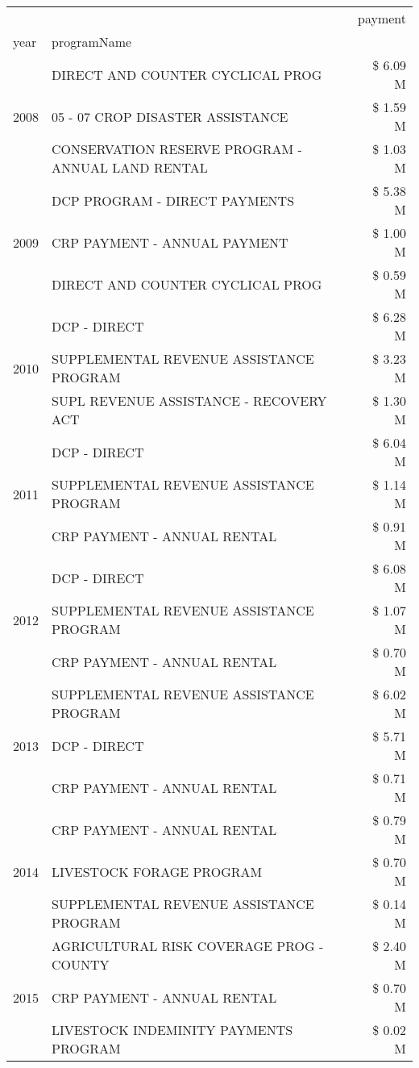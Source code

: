 \begin{tabular}{llr}
\toprule
 &  & payment \\
year & programName &  \\
\midrule
\multirow[t]{3}{*}{2008} & DIRECT AND COUNTER CYCLICAL PROG & \$ 6.09 M \\
 & 05 - 07 CROP DISASTER ASSISTANCE & \$ 1.59 M \\
 & CONSERVATION RESERVE PROGRAM - ANNUAL LAND RENTAL & \$ 1.03 M \\
\cline{1-3}
\multirow[t]{3}{*}{2009} & DCP PROGRAM - DIRECT PAYMENTS & \$ 5.38 M \\
 & CRP PAYMENT - ANNUAL PAYMENT & \$ 1.00 M \\
 & DIRECT AND COUNTER CYCLICAL PROG & \$ 0.59 M \\
\cline{1-3}
\multirow[t]{3}{*}{2010} & DCP - DIRECT & \$ 6.28 M \\
 & SUPPLEMENTAL REVENUE ASSISTANCE PROGRAM & \$ 3.23 M \\
 & SUPL REVENUE ASSISTANCE - RECOVERY ACT & \$ 1.30 M \\
\cline{1-3}
\multirow[t]{3}{*}{2011} & DCP - DIRECT & \$ 6.04 M \\
 & SUPPLEMENTAL REVENUE ASSISTANCE PROGRAM & \$ 1.14 M \\
 & CRP PAYMENT - ANNUAL RENTAL & \$ 0.91 M \\
\cline{1-3}
\multirow[t]{3}{*}{2012} & DCP - DIRECT & \$ 6.08 M \\
 & SUPPLEMENTAL REVENUE ASSISTANCE PROGRAM & \$ 1.07 M \\
 & CRP PAYMENT - ANNUAL RENTAL & \$ 0.70 M \\
\cline{1-3}
\multirow[t]{3}{*}{2013} & SUPPLEMENTAL REVENUE ASSISTANCE PROGRAM & \$ 6.02 M \\
 & DCP - DIRECT & \$ 5.71 M \\
 & CRP PAYMENT - ANNUAL RENTAL & \$ 0.71 M \\
\cline{1-3}
\multirow[t]{3}{*}{2014} & CRP PAYMENT - ANNUAL RENTAL & \$ 0.79 M \\
 & LIVESTOCK FORAGE PROGRAM & \$ 0.70 M \\
 & SUPPLEMENTAL REVENUE ASSISTANCE PROGRAM & \$ 0.14 M \\
\cline{1-3}
\multirow[t]{3}{*}{2015} & AGRICULTURAL RISK COVERAGE PROG - COUNTY & \$ 2.40 M \\
 & CRP PAYMENT - ANNUAL RENTAL & \$ 0.70 M \\
 & LIVESTOCK INDEMINITY PAYMENTS PROGRAM & \$ 0.02 M \\

\end{tabular}
